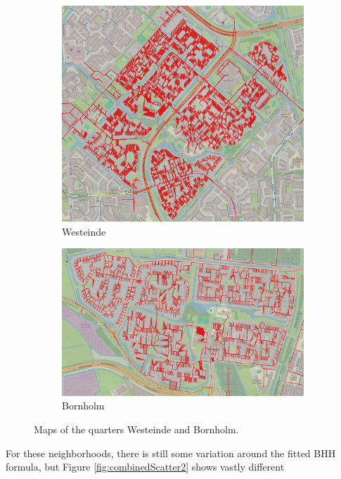 \begin{figure}[H]
	\centering
	\begin{subfigure}[b]{0.4\textwidth}
		\includegraphics[width=\textwidth]{Pictures/Westeinde_quarter.png}
		\caption{Westeinde}
		\label{fig:Westeinde}
	\end{subfigure}
	\hfill
	\begin{subfigure}[b]{0.585\textwidth}
		\includegraphics[width=\textwidth]{Pictures/Bornholm_quarter.png}
		\caption{Bornholm}
		\label{fig:Bornholm}
	\end{subfigure}
	\caption{Maps of the quarters Westeinde and Bornholm.}
	\label{fig:combined2}
\end{figure}
For these neighborhoods, there is still some variation around the fitted BHH formula, but Figure \ref{fig:combinedScatter2} shows vastly different
